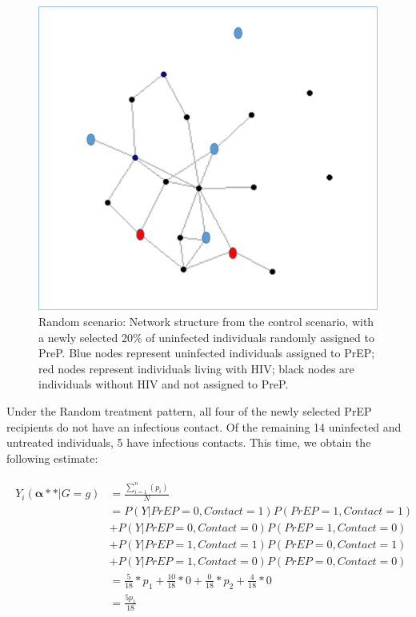 \documentclass{article}
\theoremstyle{definition}
\begin{document}
\begin{figure}[H]
    \centering
    \includegraphics[scale=0.5]{Original Figures/Network Example 3.png}
    \caption{Random scenario: Network structure from the control scenario, with a newly selected 20\%  of uninfected individuals randomly assigned to PreP. Blue nodes represent uninfected individuals assigned to PrEP; red nodes represent individuals living with HIV; black nodes are individuals without HIV and not assigned to PreP.}
    \label{fig:Figure 5}
\end{figure}

Under the Random treatment pattern, all four of the newly selected PrEP recipients do not have an infectious contact. Of the remaining 14 uninfected and untreated individuals, 5 have infectious contacts. This time, we obtain the following estimate: 

\begin{align}\label{eq:14}
\begin{split}
Y_{i}\left(\mathbf{\alpha**}|G=g\right) & = \frac{\sum_{i=1}^{n}(p_{i})}{N}  \\ 
& = P\left(Y|PrEP = 0, Contact = 1\right)P\left(PrEP = 1, Contact = 1\right)  \\ \nonumber
& +P\left(Y|PrEP = 0, Contact = 0\right)P\left(PrEP = 1, Contact = 0\right)  \\ \nonumber
& +P\left(Y|PrEP = 1, Contact = 1\right)P\left(PrEP = 0, Contact = 1\right) \\ \nonumber
&  +P\left(Y|PrEP = 1, Contact = 0\right)P\left(PrEP = 0, Contact = 0\right)\\ \nonumber
 &= \frac{5}{18}*p_1 +  \frac{10}{18}*0+\frac{0}{18}*p_2 +  \frac{4}{18}*0  \\ \nonumber
 &=\frac{5p_1}{18}  \nonumber
 \end{split}
\end{align}
\end{document}
